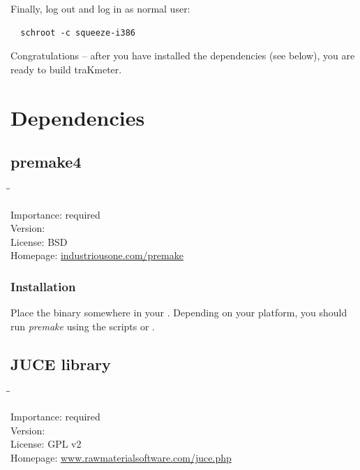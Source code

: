 Finally, log out and log in as normal user:

\begin{verbatim}
  schroot -c squeeze-i386
\end{verbatim}

Congratulations -- after you have installed the dependencies (see
below), you are ready to build traKmeter.

\section{Dependencies}

\subsection{premake4}

\begin{tabbing}
  \hspace*{6em}\=\=\kill

  Importance:  \> required \\
  Version:      \\
  License:     \> BSD \\
  Homepage:    \> \href{http://industriousone.com/premake}{industriousone.com/premake}
\end{tabbing}

\subsubsection{Installation}

Place the binary somewhere in your .  Depending on your
platform, you should run \emph{premake} using the scripts
 or .

\subsection{JUCE library}

\begin{tabbing}
  \hspace*{6em}\=\=\kill

  Importance:  \> required \\
  Version:      \\
  License:     \> GPL v2 \\
  Homepage:    \> \href{http://www.rawmaterialsoftware.com/juce.php}{www.rawmaterialsoftware.com/juce.php}
\end{tabbing}

